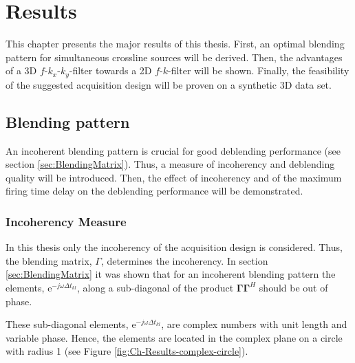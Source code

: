 \chapter{Results}

This chapter presents the major results of this thesis. First, an optimal blending pattern for simultaneous crossline sources will be derived. Then, the advantages of a 3D $f$-$k_x$-$k_y$-filter towards a 2D $f$-$k$-filter will be shown. Finally, the feasibility of the suggested acquisition design will be proven on a synthetic 3D data set. 
 
\section{Blending pattern}

An incoherent blending pattern is crucial for good deblending performance (see section \ref{sec:BlendingMatrix}). Thus, a measure of incoherency and deblending quality will be introduced. Then, the effect of incoherency and of the maximum firing time delay on the deblending performance will be demonstrated.

\subsection*{Incoherency Measure}

In this thesis only the incoherency of the acquisition design is considered. Thus, the blending matrix, $\Gamma$, determines the incoherency. In section \ref{sec:BlendingMatrix} it was shown that for an incoherent blending pattern the elements, $\mathrm{e}^{-j \omega \Delta t_{kl}}$, along a sub-diagonal of the product $\mathbf{\Gamma \Gamma}^H$ should be out of phase. 

These sub-diagonal elements, $\mathrm{e}^{-j \omega \Delta t_{kl}}$, are complex numbers with unit length and variable phase. Hence, the elements are located in the complex plane on a circle with radius 1 (see Figure \ref{fig:Ch-Results-complex-circle}). 

